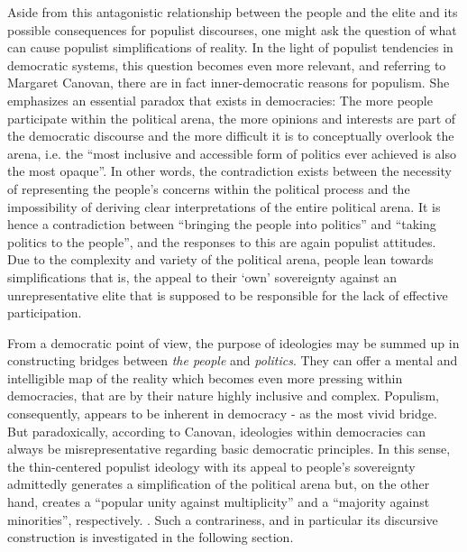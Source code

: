 \documentclass[a4paper]{scrreprt}
\begin{document}
Aside from this antagonistic relationship between the people and the elite and its possible consequences for populist discourses, one might ask the question of what can cause populist simplifications of reality. In the light of populist tendencies in democratic systems, this question becomes even more relevant, and referring to Margaret Canovan, there are in fact inner-democratic reasons for populism. She emphasizes an essential paradox that exists in democracies: The more people participate within the political arena, the more opinions and interests are part of the democratic discourse and the more difficult it is to conceptually overlook the arena, i.e. the ``most inclusive and accessible form of politics ever achieved is also the most opaque''. \cite[p.~25]{canovan:2002} In other words, the contradiction exists between the necessity of representing the people's concerns within the political process and the impossibility of deriving clear interpretations of the entire political arena. It is hence a contradiction between ``bringing the people into politics'' and ``taking politics to the people'', and the responses to this are again populist attitudes. \cite[p.~26]{canovan:2002} Due to the complexity and variety of the political arena, people lean towards simplifications that is, the appeal to their `own' sovereignty against an unrepresentative elite that is supposed to be responsible for the lack of effective participation.\par
From a democratic point of view, the purpose of ideologies may be summed up in constructing bridges between {\em the people} and {\em politics}. They can offer a mental and intelligible map of the reality which becomes even more pressing within democracies, that are by their nature highly inclusive and complex. Populism, consequently, appears to be inherent in democracy - as the most vivid bridge. But paradoxically, according to Canovan, ideologies within democracies can always be misrepresentative regarding basic democratic principles. In this sense, the thin-centered populist ideology with its appeal to people’s sovereignty admittedly generates a simplification of the political arena but, on the other hand, creates a ``popular unity against multiplicity'' and a ``majority against minorities'', respectively. \cite[p.~26]{canovan:2002}. Such a contrariness, and in particular its discursive construction is investigated in the following section.
\end{document}
